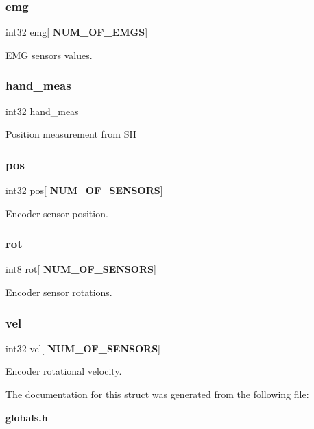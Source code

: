 \subsubsection{emg}
{\footnotesize\ttfamily int32 emg[\textbf{ N\+U\+M\+\_\+\+O\+F\+\_\+\+E\+M\+GS}]}

E\+MG sensors values. \mbox{\label{structst__meas_a2b868d93a8a34bb622e648b05a05068e}} 
\subsubsection{hand\+\_\+meas}
{\footnotesize\ttfamily int32 hand\+\_\+meas}

Position measurement from SH \mbox{\label{structst__meas_a3ee4913e7257d25d3e47cbbada9c8546}} 
\subsubsection{pos}
{\footnotesize\ttfamily int32 pos[\textbf{ N\+U\+M\+\_\+\+O\+F\+\_\+\+S\+E\+N\+S\+O\+RS}]}

Encoder sensor position. \mbox{\label{structst__meas_a26b47db1884c475bc42d76a709349f97}} 
\subsubsection{rot}
{\footnotesize\ttfamily int8 rot[\textbf{ N\+U\+M\+\_\+\+O\+F\+\_\+\+S\+E\+N\+S\+O\+RS}]}

Encoder sensor rotations. \mbox{\label{structst__meas_a8ef1e0e837efdf852aa286d20625d6a1}} 
\subsubsection{vel}
{\footnotesize\ttfamily int32 vel[\textbf{ N\+U\+M\+\_\+\+O\+F\+\_\+\+S\+E\+N\+S\+O\+RS}]}

Encoder rotational velocity. 

The documentation for this struct was generated from the following file\+:\begin{DoxyCompactItemize}
\item 
\textbf{ globals.\+h}\end{DoxyCompactItemize}
